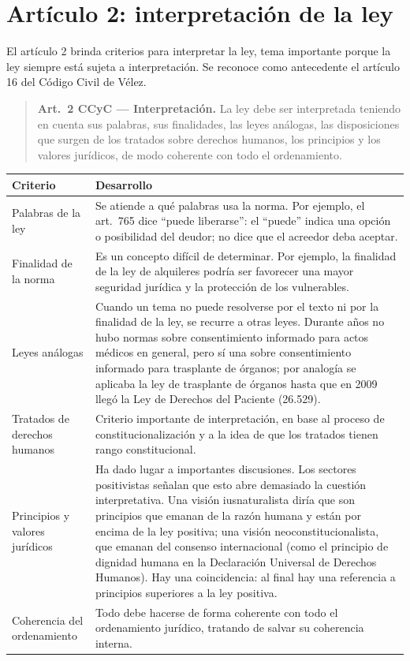 \documentclass[12pt,oneside]{book}
\begin{document}
\section{Artículo 2: interpretación de la ley}

El artículo 2 brinda criterios para interpretar la ley, tema importante porque la ley siempre está sujeta a interpretación. Se reconoce como antecedente el artículo 16 del Código Civil de Vélez.

\begin{quote}
\textbf{Art.~2 CCyC --- Interpretación.} La ley debe ser interpretada teniendo en cuenta sus palabras, sus finalidades, las leyes análogas, las disposiciones que surgen de los tratados sobre derechos humanos, los principios y los valores jurídicos, de modo coherente con todo el ordenamiento.
\end{quote}

\begin{table}[H]
\centering
\begin{tabularx}{\textwidth}{>{\raggedright\arraybackslash}p{} >{\raggedright\arraybackslash}X}
\toprule
\textbf{Criterio} & \textbf{Desarrollo} \\
\midrule
Palabras de la ley &
Se atiende a qué palabras usa la norma. Por ejemplo, el art.~765 dice ``puede liberarse'': el ``puede'' indica una opción o posibilidad del deudor; no dice que el acreedor deba aceptar. \\
\addlinespace
Finalidad de la norma &
Es un concepto difícil de determinar. Por ejemplo, la finalidad de la ley de alquileres podría ser favorecer una mayor seguridad jurídica y la protección de los vulnerables. \\
\addlinespace
Leyes análogas &
Cuando un tema no puede resolverse por el texto ni por la finalidad de la ley, se recurre a otras leyes. Durante años no hubo normas sobre consentimiento informado para actos médicos en general, pero sí una sobre consentimiento informado para trasplante de órganos; por analogía se aplicaba la ley de trasplante de órganos hasta que en 2009 llegó la Ley de Derechos del Paciente (26.529). \\
\addlinespace
Tratados de derechos humanos &
Criterio importante de interpretación, en base al proceso de constitucionalización y a la idea de que los tratados tienen rango constitucional. \\
\addlinespace
Principios y valores jurídicos &
Ha dado lugar a importantes discusiones. Los sectores positivistas señalan que esto abre demasiado la cuestión interpretativa. Una visión iusnaturalista diría que son principios que emanan de la razón humana y están por encima de la ley positiva; una visión neoconstitucionalista, que emanan del consenso internacional (como el principio de dignidad humana en la Declaración Universal de Derechos Humanos). Hay una coincidencia: al final hay una referencia a principios superiores a la ley positiva. \\
\addlinespace
Coherencia del ordenamiento &
Todo debe hacerse de forma coherente con todo el ordenamiento jurídico, tratando de salvar su coherencia interna. \\
\bottomrule
\end{tabularx}
\end{table}
\end{document}
